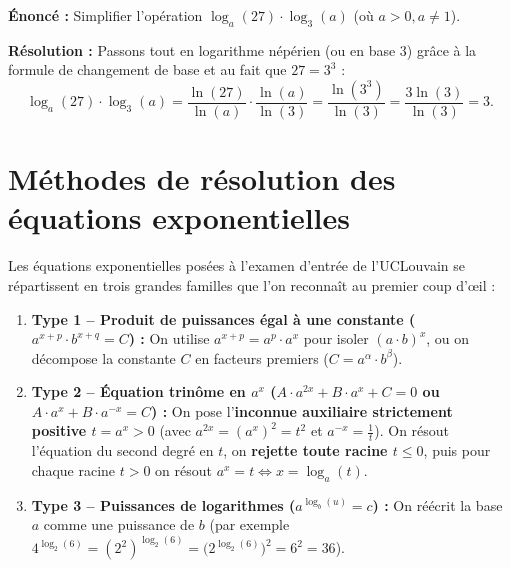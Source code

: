 \begin{exemple}
\textbf{Énoncé :} Simplifier l'opération $\log_a(27)\cdot\log_3(a)$ (où $a > 0, a \neq 1$).

\textbf{Résolution :} Passons tout en logarithme népérien (ou en base $3$) grâce à la formule de changement de base et au fait que $27 = 3^3$ :
\[
    \log_a(27)\cdot\log_3(a) = \frac{\ln(27)}{\ln(a)} \cdot \frac{\ln(a)}{\ln(3)} = \frac{\ln(3^3)}{\ln(3)} = \frac{3\ln(3)}{\ln(3)} = \boxed{3}.
\]
\end{exemple}

\section{Méthodes de résolution des équations exponentielles}

Les équations exponentielles posées à l'examen d'entrée de l'UCLouvain se répartissent en trois grandes familles que l'on reconnaît au premier coup d'œil :

\begin{astuce}
\begin{enumerate}
    \item \textbf{Type 1 -- Produit de puissances égal à une constante ($a^{x+p}\cdot b^{x+q} = C$) :} On utilise $a^{x+p} = a^p \cdot a^x$ pour isoler $(a\cdot b)^x$, ou on décompose la constante $C$ en facteurs premiers ($C = a^\alpha \cdot b^\beta$).
    \item \textbf{Type 2 -- Équation trinôme en $a^x$ ($A \cdot a^{2x} + B \cdot a^x + C = 0$ ou $A \cdot a^x + B \cdot a^{-x} = C$) :}
    On pose l'\textbf{inconnue auxiliaire strictement positive $\boxed{t = a^x > 0}$} (avec $a^{2x} = (a^x)^2 = t^2$ et $a^{-x} = \frac{1}{t}$). On résout l'équation du second degré en $t$, on \textbf{rejette toute racine $t \le 0$}, puis pour chaque racine $t > 0$ on résout $a^x = t \iff x = \log_a(t)$.
    \item \textbf{Type 3 -- Puissances de logarithmes ($a^{\log_b(u)} = c$) :} On réécrit la base $a$ comme une puissance de $b$ (par exemple $4^{\log_2(6)} = (2^2)^{\log_2(6)} = \bigl(2^{\log_2(6)}\bigr)^2 = 6^2 = 36$).
\end{enumerate}
\end{astuce}

